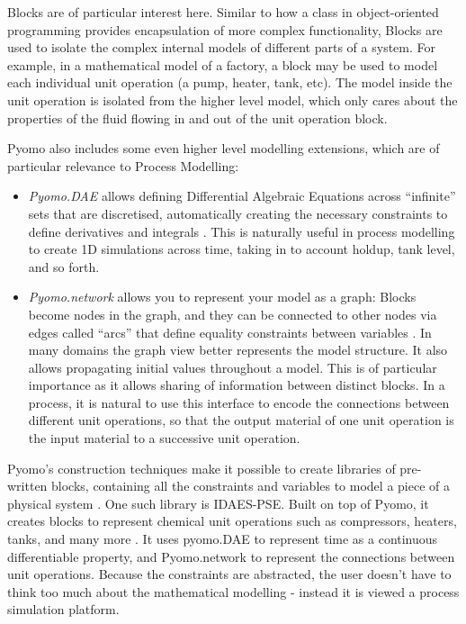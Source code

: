 Blocks are of particular interest here. Similar to how a class in
object-oriented programming provides encapsulation of more complex
functionality, Blocks are used to isolate the complex internal models of
different parts of a system. For example, in a mathematical model of a
factory, a block may be used to model each individual unit operation (a
pump, heater, tank, etc). The model inside the unit operation is
isolated from the higher level model, which only cares about the
properties of the fluid flowing in and out of the unit operation block.

Pyomo also includes some even higher level modelling extensions, which
are of particular relevance to Process Modelling:

\begin{itemize}
\tightlist
\item
  \emph{Pyomo.DAE} allows defining Differential Algebraic Equations
  across ``infinite'' sets that are discretised, automatically creating
  the necessary constraints to define derivatives and integrals
  \citep{nicholson2018pyomo}. This is naturally useful in process
  modelling to create 1D simulations across time, taking in to account
  holdup, tank level, and so forth.
\item
  \emph{Pyomo.network} allows you to represent your model as a graph:
  Blocks become nodes in the graph, and they can be connected to other
  nodes via edges called ``arcs'' that define equality constraints
  between variables \citep{bynum2021pyomo}. In many domains the graph
  view better represents the model structure. It also allows propagating
  initial values throughout a model. This is of particular importance as
  it allows sharing of information between distinct blocks. In a
  process, it is natural to use this interface to encode the connections
  between different unit operations, so that the output material of one
  unit operation is the input material to a successive unit operation.
\end{itemize}

Pyomo's construction techniques make it possible to create libraries of
pre-written blocks, containing all the constraints and variables to
model a piece of a physical system \citep{dowling2015framework}. One
such library is IDAES-PSE. Built on top of Pyomo, it creates blocks to
represent chemical unit operations such as compressors, heaters, tanks,
and many more \citep{miller2018next}. It uses pyomo.DAE to represent
time as a continuous differentiable property, and Pyomo.network to
represent the connections between unit operations. Because the
constraints are abstracted, the user doesn't have to think too much
about the mathematical modelling - instead it is viewed a process
simulation platform.


